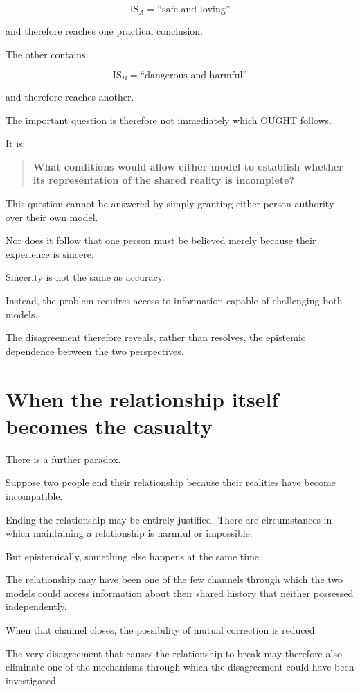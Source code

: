 \documentclass{article}
\begin{document}
\[
\text{IS}_A = \text{``safe and loving''}
\]

and therefore reaches one practical conclusion.

The other contains:

\[
\text{IS}_B = \text{``dangerous and harmful''}
\]

and therefore reaches another.

The important question is therefore not immediately which OUGHT follows.

It is:

\begin{quote}
    \textbf{What conditions would allow either model to establish whether its representation of the shared reality is incomplete?}
\end{quote}

This question cannot be answered by simply granting either person authority over their own model.

Nor does it follow that one person must be believed merely because their experience is sincere.

Sincerity is not the same as accuracy.

Instead, the problem requires access to information capable of challenging both models.

The disagreement therefore reveals, rather than resolves, the epistemic dependence between the two perspectives.

\section*{When the relationship itself becomes the casualty}

There is a further paradox.

Suppose two people end their relationship because their realities have become incompatible.

Ending the relationship may be entirely justified. There are circumstances in which maintaining a relationship is harmful or impossible.

But epistemically, something else happens at the same time.

The relationship may have been one of the few channels through which the two models could access information about their shared history that neither possessed independently.

When that channel closes, the possibility of mutual correction is reduced.

The very disagreement that causes the relationship to break may therefore also eliminate one of the mechanisms through which the disagreement could have been investigated.
\end{document}
